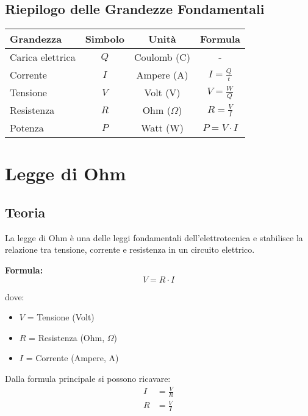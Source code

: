 \documentclass[a4paper,12pt]{article}
\begin{document}
\subsection{Riepilogo delle Grandezze Fondamentali}

\begin{center}
\begin{tabular}{|l|c|c|c|}
\hline
\textbf{Grandezza} & \textbf{Simbolo} & \textbf{Unità} & \textbf{Formula} \\
\hline
Carica elettrica & $Q$ & Coulomb (C) & - \\
\hline
Corrente & $I$ & Ampere (A) & $I = \frac{Q}{t}$ \\
\hline
Tensione & $V$ & Volt (V) & $V = \frac{W}{Q}$ \\
\hline
Resistenza & $R$ & Ohm ($\Omega$) & $R = \frac{V}{I}$ \\
\hline
Potenza & $P$ & Watt (W) & $P = V \cdot I$ \\
\hline
\end{tabular}
\end{center}

\newpage

\section{Legge di Ohm}

\subsection{Teoria}
La legge di Ohm è una delle leggi fondamentali dell'elettrotecnica e stabilisce la relazione tra tensione, corrente e resistenza in un circuito elettrico.

\textbf{Formula:}
\begin{equation}
V = R \cdot I
\end{equation}

dove:
\begin{itemize}
    \item $V$ = Tensione (Volt)
    \item $R$ = Resistenza (Ohm, $\Omega$)
    \item $I$ = Corrente (Ampere, A)
\end{itemize}

Dalla formula principale si possono ricavare:
\begin{align}
I &= \frac{V}{R} \\
R &= \frac{V}{I}
\end{align}
\end{document}
